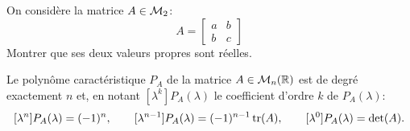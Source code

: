 \begin{exercise*}
  On considère la matrice $A \in \mathcal{M}_2$:
  $$
  A = \left[\begin{array}{cc} a & b \\ b & c\end{array}\right]
  $$
  Montrer que ses deux valeurs propres sont réelles.
\end{exercise*}


\begin{theorem}
  Le polynôme caractéristique $P_A$ de la matrice $A \in \mathcal{M}_n(\mathbb{R})$ est de degré exactement $n$ et, en notant $[\lambda^k]P_A(\lambda)$ le coefficient d'ordre $k$ de $P_A(\lambda)$:
  $$
  [\lambda^n]P_A(\lambda) = (-1)^n, \qquad
  [\lambda^{n-1}]P_A(\lambda) = (-1)^{n-1} \operatorname{tr}(A), \qquad
  [\lambda^0]P_A(\lambda) = \det(A).
  $$
\end{theorem}

